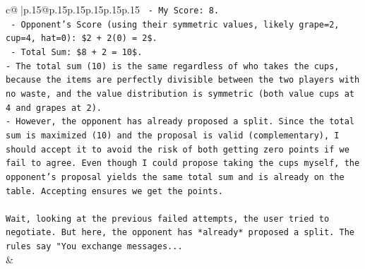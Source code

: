 \documentclass{article}
\begin{document}
{\begin{supertabular}{c@{$\;$}|p{.15\linewidth}@{}p{.15\linewidth}p{.15\linewidth}p{.15\linewidth}p{.15\linewidth}p{.15\linewidth}}
{{{\texttt{  {-} My Score: 8.} \\
\texttt{  {-} Opponent's Score (using their symmetric values, likely grape=2, cup=4, hat=0): \$2 + 2(0) = 2\$.} \\
\texttt{  {-} Total Sum: \$8 + 2 = 10\$.} \\
\texttt{{-} The total sum (10) is the same regardless of who takes the cups, because the items are perfectly divisible between the two players with no waste, and the value distribution is symmetric (both value cups at 4 and grapes at 2).} \\
\texttt{{-} However, the opponent has already proposed a split. Since the total sum is maximized (10) and the proposal is valid (complementary), I should accept it to avoid the risk of both getting zero points if we fail to agree. Even though I could propose taking the cups myself, the opponent's proposal yields the same total sum and is already on the table. Accepting ensures we get the points.} \\
\\ 
\texttt{Wait, looking at the previous failed attempts, the user tried to negotiate. But here, the opponent has *already* proposed a split. The rules say "You exchange messages...} \\
            }
        }
    }
    & \\ \\


\end{supertabular}}
\end{document}
